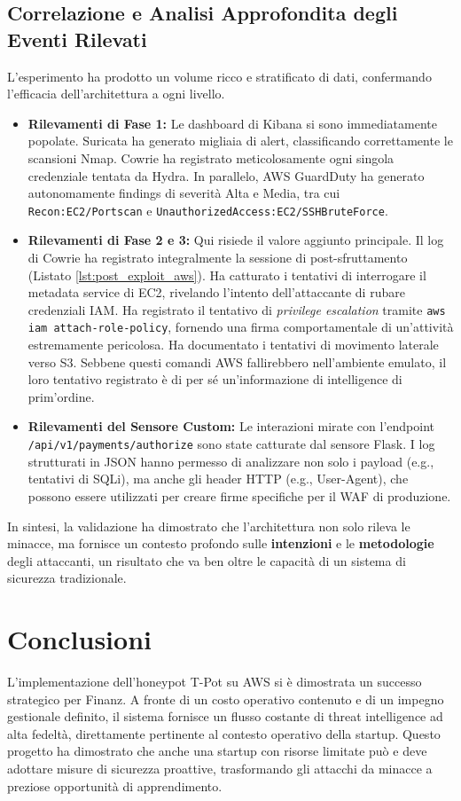 \subsection{Correlazione e Analisi Approfondita degli Eventi Rilevati}
L'esperimento ha prodotto un volume ricco e stratificato di dati, confermando l'efficacia dell'architettura a ogni livello.
\begin{itemize}
    \item \textbf{Rilevamenti di Fase 1:} Le dashboard di Kibana si sono immediatamente popolate. Suricata ha generato migliaia di alert, classificando correttamente le scansioni Nmap. Cowrie ha registrato meticolosamente ogni singola credenziale tentata da Hydra. In parallelo, AWS GuardDuty ha generato autonomamente findings di severità Alta e Media, tra cui \texttt{Recon:EC2/Portscan} e \texttt{UnauthorizedAccess:EC2/SSHBruteForce}.
    
    \item \textbf{Rilevamenti di Fase 2 e 3:} Qui risiede il valore aggiunto principale. Il log di Cowrie ha registrato integralmente la sessione di post-sfruttamento (Listato \ref{lst:post_exploit_aws}). Ha catturato i tentativi di interrogare il metadata service di EC2, rivelando l'intento dell'attaccante di rubare credenziali IAM. Ha registrato il tentativo di \textit{privilege escalation} tramite \texttt{aws iam attach-role-policy}, fornendo una firma comportamentale di un'attività estremamente pericolosa. Ha documentato i tentativi di movimento laterale verso S3. Sebbene questi comandi AWS fallirebbero nell'ambiente emulato, il loro tentativo registrato è di per sé un'informazione di intelligence di prim'ordine.
    
    \item \textbf{Rilevamenti del Sensore Custom:} Le interazioni mirate con l'endpoint \texttt{/api/v1/payments/authorize} sono state catturate dal sensore Flask. I log strutturati in JSON hanno permesso di analizzare non solo i payload (e.g., tentativi di SQLi), ma anche gli header HTTP (e.g., User-Agent), che possono essere utilizzati per creare firme specifiche per il WAF di produzione.
\end{itemize}
In sintesi, la validazione ha dimostrato che l'architettura non solo rileva le minacce, ma fornisce un contesto profondo sulle \textbf{intenzioni} e le \textbf{metodologie} degli attaccanti, un risultato che va ben oltre le capacità di un sistema di sicurezza tradizionale.
\section{Conclusioni}
\label{sec:conclusioni}

L'implementazione dell'honeypot T-Pot su AWS si è dimostrata un successo strategico per Finanz. A fronte di un costo operativo contenuto e di un impegno gestionale definito, il sistema fornisce un flusso costante di threat intelligence ad alta fedeltà, direttamente pertinente al contesto operativo della startup. Questo progetto ha dimostrato che anche una startup con risorse limitate può e deve adottare misure di sicurezza proattive, trasformando gli attacchi da minacce a preziose opportunità di apprendimento.